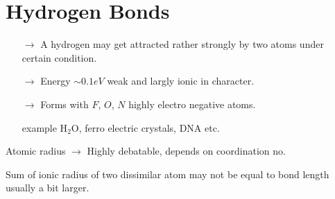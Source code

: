 \section*{Hydrogen Bonds}
\begin{itemize}
\item[$\to$] A hydrogen may get attracted rather strongly by two atoms under certain condition.

\item[$\to$] Energy $\sim 0.1eV$ weak and largly ionic in character.

\item[$\to$] Forms with $F$, $O$, $N$ highly electro negative atoms.

example H$_{2}$O, ferro electric crystals, DNA etc.
\end{itemize}

Atomic radius $\to$ Highly debatable, depends on coordination no.

Sum of ionic radius of two dissimilar atom may not be equal to bond length usually a bit larger.
